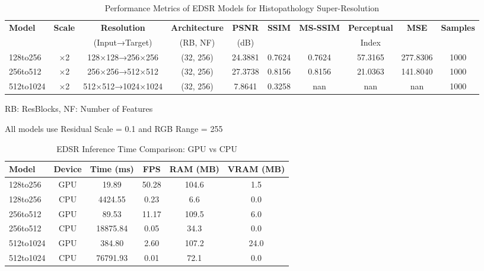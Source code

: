 
\begin{table*}[htbp]
\centering
\caption{Performance Metrics of EDSR Models for Histopathology Super-Resolution}
\label{tab:edsr_metrics}
\begin{tabular}{|l|c|c|c|c|c|c|c|c|c|}
\hline
\textbf{Model} & \textbf{Scale} & \textbf{Resolution} & \textbf{Architecture} & \textbf{PSNR} & \textbf{SSIM} & \textbf{MS-SSIM} & \textbf{Perceptual} & \textbf{MSE} & \textbf{Samples} \\
& & (Input→Target) & (RB, NF) & (dB) & & & Index & & \\
\hline
128to256 & ×2 & 128×128→256×256 & (32, 256) & 24.3881 & 0.7624 & 0.7624 & 57.3165 & 277.8306 & 1000 \\
256to512 & ×2 & 256×256→512×512 & (32, 256) & 27.3738 & 0.8156 & 0.8156 & 21.0363 & 141.8040 & 1000 \\
512to1024 & ×2 & 512×512→1024×1024 & (32, 256) & 7.8641 & 0.3258 & nan & nan & nan & 1000 \\
\hline
\end{tabular}
\begin{tablenotes}
\item RB: ResBlocks, NF: Number of Features
\item All models use Residual Scale = 0.1 and RGB Range = 255
\end{tablenotes}
\end{table*}


\begin{table}[htbp]
\centering
\caption{EDSR Inference Time Comparison: GPU vs CPU}
\label{tab:edsr_timing}
\begin{tabular}{|l|c|c|c|c|c|}
\hline
\textbf{Model} & \textbf{Device} & \textbf{Time (ms)} & \textbf{FPS} & \textbf{RAM (MB)} & \textbf{VRAM (MB)} \\
\hline
128to256 & GPU & 19.89 & 50.28 & 104.6 & 1.5 \\
128to256 & CPU & 4424.55 & 0.23 & 6.6 & 0.0 \\
256to512 & GPU & 89.53 & 11.17 & 109.5 & 6.0 \\
256to512 & CPU & 18875.84 & 0.05 & 34.3 & 0.0 \\
512to1024 & GPU & 384.80 & 2.60 & 107.2 & 24.0 \\
512to1024 & CPU & 76791.93 & 0.01 & 72.1 & 0.0 \\
\hline
\end{tabular}
\end{table}

